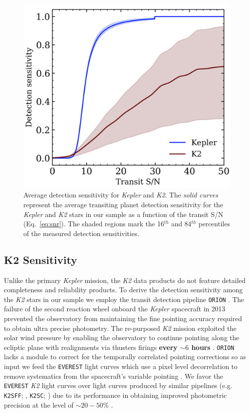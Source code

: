 \documentclass[twocolumn]{emulateapj}
\newcommand{\kepler}[1]{\emph{Kepler}#1}
\newcommand{\ktwo}[1]{\emph{K2}#1}
\newcommand{\tess}[1]{\emph{TESS}#1}
\begin{document}
\begin{figure}
  \centering
  \includegraphics[width=0.98\hsize]{figures/senscurves.png}
  \caption{Average detection sensitivity for \kepler{} and \ktwo{.} The \emph{solid curves} represent the
    average transiting planet detection sensitivity for the \kepler{} and \ktwo{} stars in our sample as
    a function of the transit S/N (Eq.~\ref{eq:snr}). The shaded regions mark the 16$^{th}$ and 84$^{th}$
    percentiles of the measured detection sensitivities.} 
  \label{fig:senscurves}
\end{figure}


\subsection{K2 Sensitivity}
Unlike the primary \kepler{} mission, the \ktwo{} data products do not feature detailed completeness and reliability
products. To derive the detection sensitivity among the \ktwo{} stars in our sample we employ the transit detection
pipeline \texttt{ORION} \citep{cloutier19b}.
The failure of the second reaction wheel onboard the \kepler{} spacecraft in 2013 prevented the observatory from
maintaining the fine pointing accuracy required to obtain ultra precise photometry. The re-purposed \ktwo{}
mission exploited the solar wind pressure by enabling the observatory to continue pointing along the ecliptic
plane with realignments via thusters firings \textbf{every $\sim 6$ hours} \citep{howell14}.
\texttt{ORION} lacks a module to correct for the temporally correlated pointing corrections so as input we feed
the \texttt{EVEREST} light curves which use a pixel level decorrelation to remove systematics from the spacecraft's
variable pointing \citep{luger16,luger18}. We favor the \texttt{EVEREST} \ktwo{} light curves over light curves
produced by similar pipelines (e.g. \texttt{K2SFF}; \citealt{vanderburg14}, \texttt{K2SC};
\citealt{aigrain15,aigrain16})
due to its performance in obtaining improved photometric precision at the level of $\sim 20-50$\% \citep{luger16}.
\end{document}
